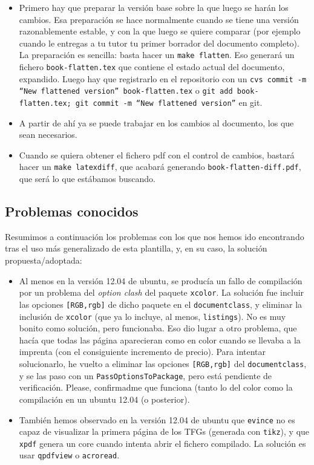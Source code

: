 \begin{itemize}
\item Primero hay que preparar la versión base sobre la que luego se
  harán los cambios. Esa preparación se hace normalmente cuando se
  tiene una versión razonablemente estable, y con la que luego se
  quiere comparar (por ejemplo cuando le entregas a tu tutor tu primer
  borrador del documento completo). La preparación es sencilla: basta
  hacer un \texttt{make flatten}. Eso generará un fichero
  \texttt{book-flatten.tex} que contiene el estado actual del
  documento, expandido. Luego hay que registrarlo en el repositorio
  con un \texttt{cvs commit -m ``New flattened version''
    book-flatten.tex} o \texttt{git add book-flatten.tex; git commit
    -m ``New flattened version''} en git.
\item A partir de ahí ya se puede trabajar en los cambios al documento,
  los que sean necesarios.
\item Cuando se quiera obtener el fichero pdf con el control de cambios,
  bastará hacer un \texttt{make latexdiff}, que acabará generando
  \texttt{book-flatten-diff.pdf}, que será lo que estábamos buscando.
\end{itemize}



\subsection{Problemas conocidos}
\label{sec:problemas-conocidos}

Resumimos a continuación los problemas con los que nos hemos ido
encontrando tras el uso más generalizado de esta plantilla, y, en su
caso, la solución propuesta/adoptada:

\begin{itemize}

\item Al menos en la versión 12.04 de ubuntu, se producía un fallo de
  compilación por un problema del \textit{option clash} del paquete
  \texttt{xcolor}. La solución fue incluir las opciones
  \texttt{[RGB,rgb]} de dicho paquete en el \texttt{documentclass}, y
  eliminar la inclusión de \texttt{xcolor} (que ya lo incluye, al menos,
  \texttt{listings}). No es muy bonito como solución, pero
  funcionaba. Eso dio lugar a otro problema, que hacía que todas las
  página aparecieran como en color cuando se llevaba a la imprenta (con
  el consiguiente incremento de precio). Para intentar solucionarlo, he
  vuelto a eliminar las opciones \texttt{[RGB,rgb]} del
  \texttt{documentclass}, y se las paso con un
  \texttt{PassOptionsToPackage}, pero está pendiente de
  verificación. Please, confirmadme que funciona (tanto lo del color
  como la compilación en un ubuntu 12.04 (o posterior).

\item También hemos observado en la versión 12.04 de ubuntu que
  \texttt{evince} no es capaz de visualizar la primera página de los
  TFGs (generada con \texttt{tikz}), y que \texttt{xpdf} genera un core
  cuando intenta abrir el fichero compilado. La solución es usar
  \texttt{qpdfview} o \texttt{acroread}. 

\end{itemize}

